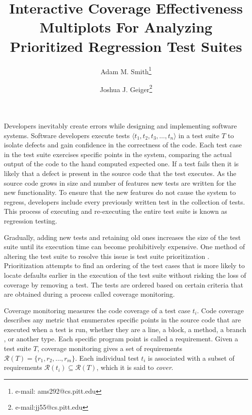 \documentclass{vgtc}                          %
\title{Interactive Coverage Effectiveness Multiplots For Analyzing \\ Prioritized Regression Test Suites }
\author{Adam M. Smith\thanks{e-mail: ams292@cs.pitt.edu} %
\and Joshua J. Geiger\thanks{e-mail:jj55@cs.pitt.edu}} %
\affiliation{\scriptsize University of Pittsburgh}
\begin{document}


\maketitle


Developers inevitably create errors while designing and implementing software systems. Software developers execute tests $\langle t_1, t_2, t_3,\ldots, t_n\rangle$ in a test suite $T$ to isolate defects and gain confidence in the correctness of the code.  Each test case in the test suite exercises specific points in the system, comparing the actual output of the code to the hand computed expected one.  If a test fails then it is likely that a defect is present in the source code that the test executes.  As the source code grows in size and number of features new tests are written for the new functionality.  To ensure that the new features do not cause the system to regress, developers include every previously written test in the collection of tests.  This process of executing and re-executing the entire test suite is known as regression testing.  

Gradually, adding new tests and retaining old ones increases the size of the test suite until its execution time can become prohibitively expensive.  One method of altering the test suite to resolve this issue is test suite prioritization \cite{rothermelprioritizing2001}.  Prioritization attempts to find an ordering of the test cases that is more likely to locate defaults earlier in the execution of the test suite without risking the loss of coverage by removing a test.  The tests are ordered based on certain criteria that are obtained during a process called coverage monitoring.  

Coverage monitoring measures the code coverage of a test case $t_i$.  Code coverage describes any metric that enumerates specific points in the source code that are executed when a test is run, whether they are a line, a block, a method, a branch \cite{zhu}, or another type. Each specific program point is called a requirement.  Given a test suite $T$, coverage monitoring gives a set of requirements $\mathcal{R}(T) = \{ r_1, r_2,\ldots,r_m \}$.  Each individual test $t_i$ is associated with a subset of requirements $\mathcal{R}(t_i) \subseteq \mathcal{R}(T)$, which it is said to \textit{cover}.  
\end{document}
